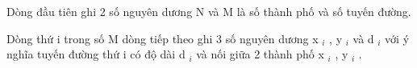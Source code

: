 Dòng đầu tiên ghi 2 số nguyên dương N và M là số thành phố và số tuyến đường.  

   Dòng thứ i trong số M dòng tiếp theo ghi 3 số nguyên dương x   $_    i   $   , y   $_    i   $   và d   $_    i   $   với ý nghĩa tuyến đường thứ i có độ dài d   $_    i   $   và nối giữa 2 thành phố x   $_    i   $   , y   $_    i   $   .